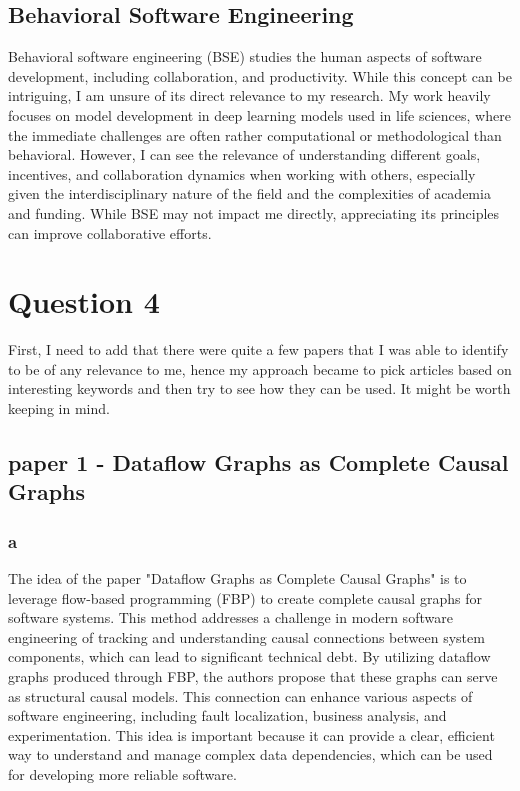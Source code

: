 \documentclass{article}
\begin{document}
\subsection{Behavioral Software Engineering}
Behavioral software engineering (BSE) studies the human aspects of software development, including collaboration, and productivity. While this concept can be intriguing, I am unsure of its direct relevance to my research. My work heavily focuses on model development in deep learning models used in life sciences, where the immediate challenges are often rather computational or methodological than behavioral. However, I can see the relevance of understanding different goals, incentives, and collaboration dynamics when working with others, especially given the interdisciplinary nature of the field and the complexities of academia and funding. While BSE may not impact me directly, appreciating its principles can improve collaborative efforts.

\section{Question 4}

First, I need to add that there were quite a few papers that I was able to identify to be of any relevance to me, hence my approach became to pick articles based on interesting keywords and then try to see how they can be used. It might be worth keeping in mind. 

\subsection{paper 1 - Dataflow Graphs as Complete Causal Graphs}

\subsubsection{a}
The idea of the paper "Dataflow Graphs as Complete Causal Graphs" is to leverage flow-based programming (FBP) to create complete causal graphs for software systems. This method addresses a challenge in modern software engineering of tracking and understanding causal connections between system components, which can lead to significant technical debt. By utilizing dataflow graphs produced through FBP, the authors propose that these graphs can serve as structural causal models. This connection can enhance various aspects of software engineering, including fault localization, business analysis, and experimentation. This idea is important because it can provide a clear, efficient way to understand and manage complex data dependencies, which can be used for developing more reliable software.
\end{document}

